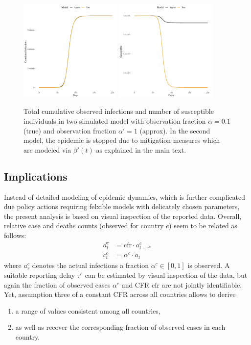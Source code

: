 \documentclass[fullpage,a4paper]{article}
\begin{document}
\begin{figure}
  \includegraphics[width=0.45\textwidth]{../figs/approx_infect.pdf}
  \includegraphics[width=0.45\textwidth]{../figs/approx_suscept.pdf}
  \caption{\label{fig:SIRapprox} Total cumulative observed infections
    and number of susceptible individuals in two simulated model with
    observation fraction $\alpha = 0.1$ (true) and observation
    fraction $\alpha' = 1$ (approx). In the second model, the epidemic
    is stopped due to mitigation measures which are modeled via
    $\beta'(t)$ as explained in the main text.}
\end{figure}

\subsection{Implications}

Instead of detailed modeling of epidemic dynamics, which is further
complicated due policy actions requiring felxible models with
delicately chosen parameters, the present analysis is based on visual
inspection of the reported data. Overall, relative case and deaths
counts (observed for country $c$) seem to be related as follows:
\begin{align*}
  d^c_t &= \mathrm{cfr} \cdot a^c_{t - {\tau^c}} \\
  c^c_t &= \alpha^c \cdot a_t
\end{align*}
where $a^c_r$ denotes the actual infections a fraction $\alpha^c \in
[0, 1]$ is observed. A suitable reporting delay $\tau^c$ can be
estimated by visual inspection of the data, but again the fraction of
observed cases $\alpha^c$ and CFR $\mathrm{cfr}$ are not jointly
identifiable. Yet, assumption three of a constant CFR across all
countries allows to derive
\begin{enumerate}
\item a range of values consistent among all countries,
\item as well as recover the corresponding fraction of observed cases
  in each country.
\end{enumerate}
\end{document}
